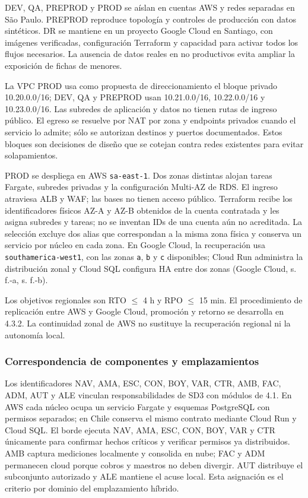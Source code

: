 \documentclass[11pt,letterpaper]{report}
\providecommand{\RTO}{RTO $\leq$ 4 h}
\providecommand{\RPO}{RPO $\leq$ 15 min}
\begin{document}
DEV, QA, PREPROD y PROD se aíslan en cuentas AWS y redes separadas en São Paulo. PREPROD reproduce topología y controles de producción con datos sintéticos. DR se mantiene en un proyecto Google Cloud en Santiago, con imágenes verificadas, configuración Terraform y capacidad para activar todos los flujos necesarios. La ausencia de datos reales en no productivos evita ampliar la exposición de fichas de menores.

La VPC PROD usa como propuesta de direccionamiento el bloque privado 10.20.0.0/16; DEV, QA y PREPROD usan 10.21.0.0/16, 10.22.0.0/16 y 10.23.0.0/16. Las subredes de aplicación y datos no tienen rutas de ingreso público. El egreso se resuelve por NAT por zona y endpoints privados cuando el servicio lo admite; sólo se autorizan destinos y puertos documentados. Estos bloques son decisiones de diseño que se cotejan contra redes existentes para evitar solapamientos.

PROD se despliega en AWS \texttt{sa-east-1}. Dos zonas distintas alojan tareas Fargate, subredes privadas y la configuración Multi-AZ de RDS. El ingreso atraviesa ALB y WAF; las bases no tienen acceso público. Terraform recibe los identificadores físicos AZ-A y AZ-B obtenidos de la cuenta contratada y les asigna subredes y tareas; no se inventan IDs de una cuenta aún no acreditada. La selección excluye dos alias que correspondan a la misma zona física y conserva un servicio por núcleo en cada zona. En Google Cloud, la recuperación usa \texttt{southamerica-west1}, con las zonas \texttt{a}, \texttt{b} y \texttt{c} disponibles; Cloud Run administra la distribución zonal y Cloud SQL configura HA entre dos zonas (Google Cloud, s. f.-a, s. f.-b).

Los objetivos regionales son \RTO{} y \RPO{}. El procedimiento de replicación entre AWS y Google Cloud, promoción y retorno se desarrolla en 4.3.2. La continuidad zonal de AWS no sustituye la recuperación regional ni la autonomía local.

\subsubsection*{Correspondencia de componentes y emplazamientos}

Los identificadores NAV, AMA, ESC, CON, BOY, VAR, CTR, AMB, FAC, ADM, AUT y ALE vinculan responsabilidades de SD3 con módulos de 4.1. En AWS cada núcleo ocupa un servicio Fargate y esquemas PostgreSQL con permisos separados; en Chile conserva el mismo contrato mediante Cloud Run y Cloud SQL. El borde ejecuta NAV, AMA, ESC, CON, BOY, VAR y CTR únicamente para confirmar hechos críticos y verificar permisos ya distribuidos. AMB captura mediciones localmente y consolida en nube; FAC y ADM permanecen cloud porque cobros y maestros no deben divergir. AUT distribuye el subconjunto autorizado y ALE mantiene el acuse local. Esta asignación es el criterio por dominio del emplazamiento híbrido.
\end{document}
